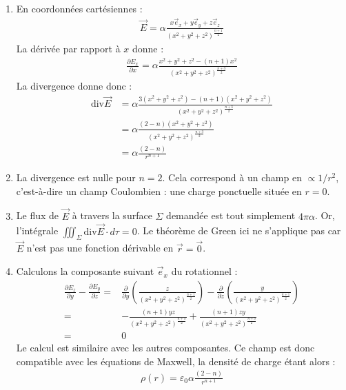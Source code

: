 \begin{correction}

\begin{enumerate}

	\item En coordonnées cartésiennes :
	\begin{align*}
		\vec{E} = \alpha\frac{x\vec{e}_x+y\vec{e}_y+z\vec{e}_z}{\left(x^2+y^2+z^2 \right)^\frac{n+1}{2}}
	\end{align*}
	La dérivée par rapport à $x$ donne :
	\begin{align*}
		\frac{\partial E_x}{\partial x}=\alpha\frac{x^2+y^2+z^2-(n+1)x^2}{\left(x^2+y^2+z^2 \right)^\frac{n+3}{2}}
	\end{align*}
	La divergence donne donc :
	\begin{align*}
		\mathrm{div}\vec{E} &=\alpha\frac{3(x^2+y^2+z^2)-(n+1)(x^2+y^2+z^2)}{\left(x^2+y^2+z^2 \right)^\frac{n+3}{2}} \\
		&=\alpha\frac{(2-n)(x^2+y^2+z^2)}{\left(x^2+y^2+z^2 \right)^\frac{n+3}{2}} \\
		&=\alpha\frac{(2-n)}{r^{n+1}}
	\end{align*}
	
	\item La divergence est nulle pour $n=2$. Cela correspond à un champ en $\propto 1/r^2$, c'est-à-dire un champ Coulombien : une charge ponctuelle située en $r=0$.
	
	\item Le flux de $\vec{E}$ à travers la surface $\Sigma$ demandée est tout simplement $4\pi\alpha$. Or, l'intégrale $\iiint_\Sigma\mathrm{div}\vec{E}\cdot d\tau=0$. Le théorème de Green ici ne s'applique pas car $\vec{E}$ n'est pas une fonction dérivable en $\vec{r}=\vec{0}$. 
	
	\item Calculons la composante suivant $\vec{e}_x$ du rotationnel :
	\begin{align*}
		\frac{\partial E_z}{\partial y}-\frac{\partial E_y}{\partial z}=&\frac{\partial }{\partial y}\left( \frac{z}{{\left(x^2+y^2+z^2 \right)^\frac{n+1}{2}}}\right) -\frac{\partial }{\partial z}\left( \frac{y}{{\left(x^2+y^2+z^2 \right)^\frac{n+1}{2}}}\right) \\
		=& -\frac{(n+1)yz}{{\left(x^2+y^2+z^2 \right)^\frac{n+3}{2}}}+\frac{(n+1)zy}{{\left(x^2+y^2+z^2 \right)^\frac{n+3}{2}}} \\
		=&0
	\end{align*}
	Le calcul est similaire avec les autres composantes. Ce champ est donc compatible avec les équations de Maxwell, la densité de charge étant alors :
	\begin{align*}
		\rho(r)=\varepsilon_0\alpha\frac{(2-n)}{r^{n+1}}
	\end{align*}
	
\end{enumerate}

\end{correction}

